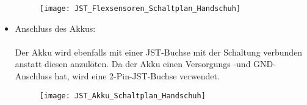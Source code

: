 \documentclass[11pt]{article}
\begin{document}
\begin{itemize}
\begin{figure}[H]
			\begin{center}
				\scalebox{0.5}
				{\texttt{[image: JST\_Flexsensoren\_Schaltplan\_Handschuh]}}
			\end{center}
		\end{figure}
	\item Anschluss des Akkus: \\
		  \\
		  Der Akku wird ebenfalls mit einer JST-Buchse mit der Schaltung verbunden anstatt diesen anzulöten. Da der Akku einen
		  Versorgungs -und GND-Anschluss hat, wird eine 2-Pin-JST-Buchse verwendet. \\
		  \begin{figure}[H]
			\begin{center}
				\scalebox{0.5}
				{\texttt{[image: JST\_Akku\_Schaltplan\_Handschuh]}}
			\end{center}
		\end{figure}\end{itemize}
\end{document}
